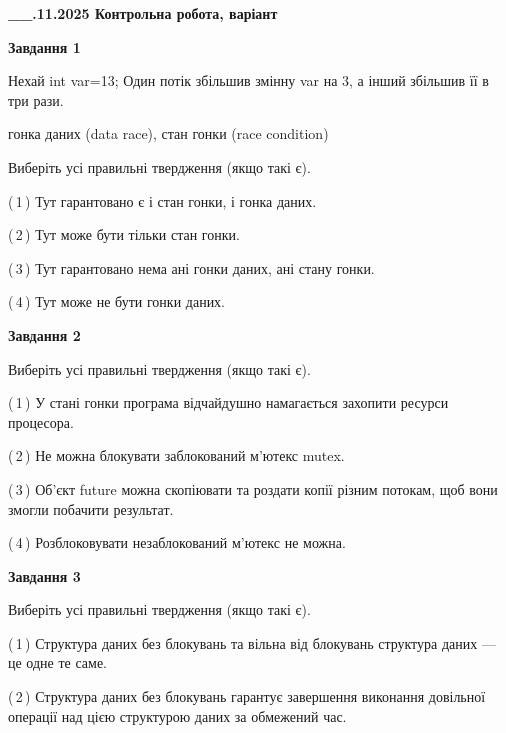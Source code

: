 \documentclass[12pt, ukrainian]{article}
\begin{document}
\begin {large}

\textbf{\_\_.11.2025 Контрольна робота, варіант  }\par


{

\begin{center}
\textbf{Завдання 1}
\end{center}
Нехай int var=13; Один потік збільшив змінну var на 3, а інший збільшив її в три рази.

гонка даних (data race), стан гонки (race condition)

Виберіть усі правильні твердження (якщо такі є).\par
\vspace{2mm}
(\,1\,) Тут гарантовано є і стан гонки, і гонка даних.%

(\,2\,) Тут може бути тільки стан гонки.%

(\,3\,) Тут гарантовано нема ані гонки даних, ані стану гонки.%

(\,4\,) Тут може не бути гонки даних.%



\begin{center}
\textbf{Завдання 2}
\end{center}
Виберіть усі правильні твердження (якщо такі є).\par
\vspace{2mm}

(\,1\,) У стані гонки програма відчайдушно намагається захопити ресурси процесора.%

(\,2\,) Не можна блокувати заблокований м’ютекс mutex.%

(\,3\,) Об’єкт future можна скопіювати та роздати копії різним потокам, щоб вони змогли побачити результат.%

(\,4\,) Розблоковувати незаблокований м’ютекс не можна.%



\begin{center}
\textbf{Завдання 3}
\end{center}
Виберіть усі правильні твердження (якщо такі є).\par
\vspace{2mm}

(\,1\,) Структура даних без блокувань та вільна від блокувань структура даних --- це одне те саме.%

(\,2\,) Структура даних без блокувань гарантує завершення виконання довільної операції над цією структурою даних за обмежений час.%

}
\end{large}
\end{document}
